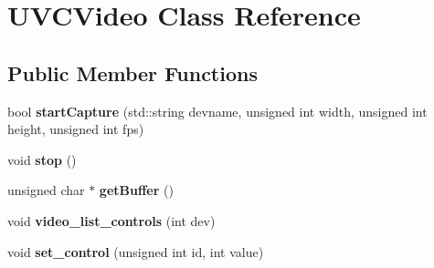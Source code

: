 \hypertarget{classUVCVideo}{\section{\-U\-V\-C\-Video \-Class \-Reference}
\label{classUVCVideo}
}
\subsection*{\-Public \-Member \-Functions}
\begin{DoxyCompactItemize}
\item 
\hypertarget{classUVCVideo_ab10bd2aebb70fddc0b5eb92ae9193b66}{bool {\bfseries start\-Capture} (std\-::string devname, unsigned int width, unsigned int height, unsigned int fps)}\label{classUVCVideo_ab10bd2aebb70fddc0b5eb92ae9193b66}

\item 
\hypertarget{classUVCVideo_a3d846311f13d549ed49a1ac2a72d7054}{void {\bfseries stop} ()}\label{classUVCVideo_a3d846311f13d549ed49a1ac2a72d7054}

\item 
\hypertarget{classUVCVideo_a950626d7ad482c9001ec1d07b25fe636}{unsigned char $\ast$ {\bfseries get\-Buffer} ()}\label{classUVCVideo_a950626d7ad482c9001ec1d07b25fe636}

\item 
\hypertarget{classUVCVideo_a00909409a4eafc881ee10d569d8531f5}{void {\bfseries video\-\_\-list\-\_\-controls} (int dev)}\label{classUVCVideo_a00909409a4eafc881ee10d569d8531f5}

\item 
\hypertarget{classUVCVideo_a98fa8a448c8ae97080e5f424a4c2e7f6}{void {\bfseries set\-\_\-control} (unsigned int id, int value)}\label{classUVCVideo_a98fa8a448c8ae97080e5f424a4c2e7f6}

\end{DoxyCompactItemize}
